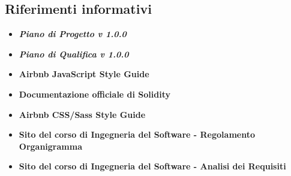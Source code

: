 \documentclass[NormeDiProgetto.tex]{subfiles}
\begin{document}
\subsection{Riferimenti informativi}
\begin{itemize}
	\item \textbf{\textit{Piano di Progetto v 1.0.0}}
	\item \textbf{\textit{Piano di Qualifica v 1.0.0}}
	\item \textbf{Airbnb JavaScript Style Guide}\\
	\item \textbf{Documentazione officiale di Solidity}\\
	\item \textbf{Airbnb CSS/Sass Style Guide}\\
	\item \textbf{Sito del corso di Ingegneria del Software - Regolamento Organigramma}\\
	\item \textbf{Sito del corso di Ingegneria del Software - Analisi dei Requisiti}\\
\end{itemize}
\end{document}

